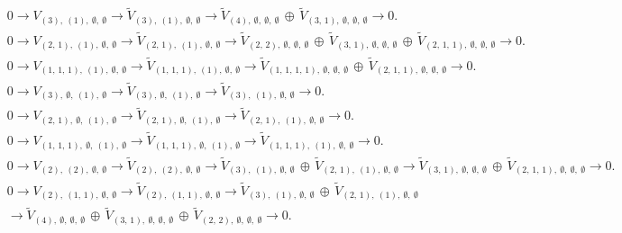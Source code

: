 \documentclass[openany, a4paper]{amsbook}
\theoremstyle{definition}
\numberwithin{equation}{chapter}
\begin{document}
\begin{align*} &
0 \to 
V_{ (3), \ (1), \ \emptyset, \ \emptyset }\to
\tilde{V}_{ (3), \ (1), \ \emptyset, \ \emptyset }
\to
\tilde{V}_{ (4), \ \emptyset, \ \emptyset, \ \emptyset }\,\oplus\,\tilde{V}_{ (3,\,1), \ \emptyset, \ \emptyset, \ \emptyset }
\to 0.
\\ &
0 \to 
V_{ (2,\,1), \ (1), \ \emptyset, \ \emptyset }\to
\tilde{V}_{ (2,\,1), \ (1), \ \emptyset, \ \emptyset } 
\to
\tilde{V}_{ (2,\,2), \ \emptyset, \ \emptyset, \ \emptyset }\,\oplus\,\tilde{V}_{ (3,\,1), \ \emptyset, \ \emptyset, \ \emptyset }\,\oplus\,\tilde{V}_{ (2,\,1,\,1), \ \emptyset, \ \emptyset, \ \emptyset }
\to 0.
\\ &
0 \to 
V_{ (1,\,1,\,1), \ (1), \ \emptyset, \ \emptyset }\to
\tilde{V}_{ (1,\,1,\,1), \ (1), \ \emptyset, \ \emptyset }
\to
\tilde{V}_{ (1,\,1,\,1,\,1), \ \emptyset, \ \emptyset, \ \emptyset }\,\oplus\,\tilde{V}_{ (2,\,1,\,1), \ \emptyset, \ \emptyset, \ \emptyset }
\to 0.
\\ &
0 \to 
V_{ (3), \ \emptyset, \ (1), \ \emptyset }\to
\tilde{V}_{ (3), \ \emptyset, \ (1), \ \emptyset }
\to
\tilde{V}_{ (3), \ (1), \ \emptyset, \ \emptyset }
\to 0.
\\ &
0 \to 
V_{ (2,\,1), \ \emptyset, \ (1), \ \emptyset }\to
\tilde{V}_{ (2,\,1), \ \emptyset, \ (1), \ \emptyset }
\to
\tilde{V}_{ (2,\,1), \ (1), \ \emptyset, \ \emptyset }
\to 0.
\\ &
0 \to 
V_{ (1,\,1,\,1), \ \emptyset, \ (1), \ \emptyset }\to
\tilde{V}_{ (1,\,1,\,1), \ \emptyset, \ (1), \ \emptyset }
\to
\tilde{V}_{ (1,\,1,\,1), \ (1), \ \emptyset, \ \emptyset }
\to 0.
\\ &
0 \to 
V_{ (2), \ (2), \ \emptyset, \ \emptyset }\to
\tilde{V}_{ (2), \ (2), \ \emptyset, \ \emptyset }
\to
\tilde{V}_{ (3), \ (1), \ \emptyset, \ \emptyset }\,\oplus\,\tilde{V}_{ (2,\,1), \ (1), \ \emptyset, \ \emptyset }
\to
\tilde{V}_{ (3,\,1), \ \emptyset, \ \emptyset, \ \emptyset }\,\oplus\,\tilde{V}_{ (2,\,1,\,1), \ \emptyset, \ \emptyset, \ \emptyset }
\to 0.
\\ &
0 \to 
V_{ (2), \ (1,\,1), \ \emptyset, \ \emptyset }\to
\tilde{V}_{ (2), \ (1,\,1), \ \emptyset, \ \emptyset }
\to
\tilde{V}_{ (3), \ (1), \ \emptyset, \ \emptyset }\,\oplus\,\tilde{V}_{ (2,\,1), \ (1), \ \emptyset, \ \emptyset } \\ &
\to
\tilde{V}_{ (4), \ \emptyset, \ \emptyset, \ \emptyset }\,\oplus\,\tilde{V}_{ (3,\,1), \ \emptyset, \ \emptyset, \ \emptyset }\,\oplus\,\tilde{V}_{ (2,\,2), \ \emptyset, \ \emptyset, \ \emptyset }
\to 0.

\end{align*}
\end{document}
